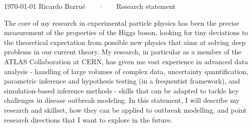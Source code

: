 \documentclass[11pt, a4paper]{awesome-cv}
\begin{document}
\makecvheader[R]

\makecvfooter
  {\today}
  {Ricardo Barrué ~~~·~~~ Research statement}
  {}

\makelettertitle

\begin{cvletter}

The core of my research in experimental particle physics has been the precise measurement of the properties of the Higgs boson, looking for tiny deviations to the theoretical expectation from possible new physics that aims at solving deep problems in our current theory. My research, in particular as a member of the ATLAS Collaboration at CERN, has given me vast experience in advanced data analysis - handling of large volumes of complex data, uncertainty quantification, parametric inference and hypothesis testing (in a frequentist framework), and simulation-based inference methods - skills that can be adapted to tackle key challenges in disease outbreak modeling. In this statement, I will describe my research and skillset, how they can be applied to outbreak modelling, and point research directions that I want to explore in the future.




\end{cvletter}
\end{document}
